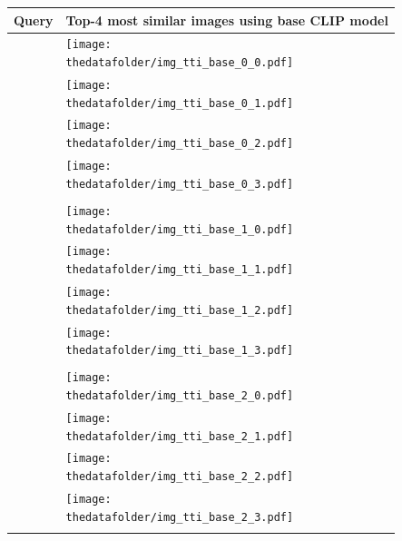 \documentclass[10pt]{article} %
\begin{document}
\begin{table}[h!]
  \centering
  \begin{tabular}{m{3cm} p{3cm} p{3cm} p{3cm} p{3cm}}
      \toprule
      \centering \bfseries Query & \multicolumn{4}{c}{\bfseries{Top-4 most similar images using \textcolor{deeppurple}{base CLIP model}}} \tabularnewline
      \midrule
       \texttt{} \vspace{20mm} & \centering \texttt{[image: \\thedatafolder/img\_tti\_base\_0\_0.pdf]} \\  & \centering \texttt{[image: \\thedatafolder/img\_tti\_base\_0\_1.pdf]} \\  & \centering \texttt{[image: \\thedatafolder/img\_tti\_base\_0\_2.pdf]} \\  & \centering \texttt{[image: \\thedatafolder/img\_tti\_base\_0\_3.pdf]} \\   \tabularnewline
      \midrule
      \texttt{} \vspace{20mm} & \centering \texttt{[image: \\thedatafolder/img\_tti\_base\_1\_0.pdf]} \\  & \centering \texttt{[image: \\thedatafolder/img\_tti\_base\_1\_1.pdf]} \\  & \centering \texttt{[image: \\thedatafolder/img\_tti\_base\_1\_2.pdf]} \\  & \centering \texttt{[image: \\thedatafolder/img\_tti\_base\_1\_3.pdf]} \\   \tabularnewline
      \midrule
      \texttt{} \vspace{20mm} & \centering \texttt{[image: \\thedatafolder/img\_tti\_base\_2\_0.pdf]} \\  & \centering \texttt{[image: \\thedatafolder/img\_tti\_base\_2\_1.pdf]} \\  & \centering \texttt{[image: \\thedatafolder/img\_tti\_base\_2\_2.pdf]} \\  & \centering \texttt{[image: \\thedatafolder/img\_tti\_base\_2\_3.pdf]} \\   \tabularnewline

\end{tabular}
\end{table}
\end{document}
